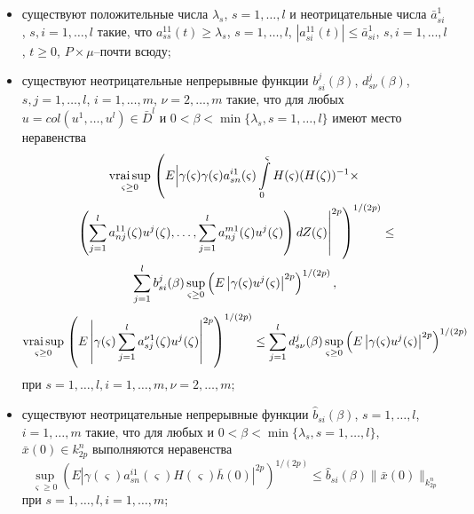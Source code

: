 \begin{itemize}
    \item существуют положительные числа  $ \lambda _s$, $s = 1, \dots, l$ и
    неотрицательные числа $\bar a_{si}^1$, $s,i = 1,
     \dots, l$ такие, что $a^{11}_{ss}(t) \geq
     \lambda _s$, $s = 1,\dots,l$, $|a^{11}_{si}(t)|\leq \bar a^1_{si}$, $s,i = 1, \dots, l$, $t \geq 0$, $P\times\mu$--почти
    всюду;

    \item  существуют неотрицательные непрерывные функции $b_{si}^j(\beta)$,
    $d_{s\nu}^j(\beta)$, $s, j = 1, \dots, l$, $i = 1, \dots, m$, $\nu = 2,
    \dots, m$ такие, что для любых $u = col (u^1, \dots, u^l) \in \bar D^l$
    и $0 < \beta < \min \{\lambda _s, s = 1,
    \dots, l \}$ имеют  место неравенства
\begin{multline*}\mathrel {\mathop
     {\operatorname*{vrai} \sup} \limits _{\varsigma \geq 0}} \left(E\Bigl|\gamma
    (\varsigma)\gamma (\varsigma )a^{i1}_{sn}(\varsigma ) \int \limits
    _{0}^\varsigma H(\varsigma)(H(\zeta))^{-1}\times\Bigr.\right.\\
     \left.\left.\left(\sum \limits _{j=1}^l
    a_{nj}^{11}(\zeta)u^j(\zeta ),\dots,\sum \limits _{j=1}^l
    a_{nj}^{m1}(\zeta)u^j(\zeta )\right)dZ(\zeta )\right|^{2p}\right)^{1/(2p)} \leq\\
    \sum \limits_{j=1}^lb_{si}^j(\beta)\sup \limits_{\varsigma \geq 0}\left (E\left |\gamma
    (\varsigma)u^j(\varsigma)\right |^{2p}\right )^{1/(2p)},
\end{multline*} 
$$
     \mathrel {\mathop {\operatorname*{vrai} \sup}\limits _{\varsigma \geq 0}}
    \left(E\left |\gamma (\varsigma)\sum \limits _{j=1}^l
    a_{sj}^{\nu1}(\zeta)u^j(\zeta )\right |^{2p}\right )^{1/(2p)} \leq
    \sum \limits_{j=1}^ld_{s\nu}^j(\beta)\sup \limits _{\varsigma \geq
    0}\left (E\left |\gamma (\varsigma)u^j(\varsigma)\right |^{2p}\right
    )^{1/(2p)}
$$
    при $s = 1,\dots,l, i = 1, \dots, m , \nu =2,
    \dots, m$;

    \item  существуют неотрицательные непрерывные функции $\hat
    b_{si}(\beta)$, $s= 1, \dots, l$, $i= 1, \dots, m$ такие,  что для любых
    и $0 < \beta < \min \{\lambda _s, s = 1, \dots, l \}$,  $\bar x(0) \in
    k_{2p}^n$ выполняются неравенства\\
    \begin{equation*} \sup \limits _{\varsigma \geq 0}\left (E\left |\gamma (\varsigma)
    a^{i1}_{sn}(\varsigma)H(\varsigma) \bar h(0)\right |^{2p}\right
    )^{1/(2p)} \leq \hat b_{si}(\beta)\|\bar x(0)\|_{k^n_{2p}}
    \end{equation*} при $s = 1,\dots,l, i = 1, \dots, m$;


\end{itemize}
